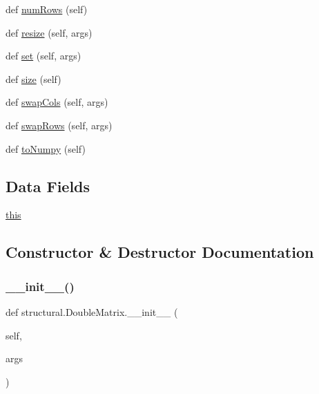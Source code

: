 \begin{DoxyCompactItemize}
def \hyperlink{classstructural_1_1_double_matrix_ac0206186f7a02e55aab1b4e7644a5a42}{num\+Rows} (self)
\item 
def \hyperlink{classstructural_1_1_double_matrix_ad669bca5d79c58f5d458573399972008}{resize} (self, args)
\item 
def \hyperlink{classstructural_1_1_double_matrix_a6f07b8fbbca87434b0a90c895235a7db}{set} (self, args)
\item 
def \hyperlink{classstructural_1_1_double_matrix_ae8ffc645068e1a857a1fcd0ff2827298}{size} (self)
\item 
def \hyperlink{classstructural_1_1_double_matrix_af32016ca742674bd0dd7976aba7fc2ab}{swap\+Cols} (self, args)
\item 
def \hyperlink{classstructural_1_1_double_matrix_aca79974b91d141231f5f2ac5bd4e55a4}{swap\+Rows} (self, args)
\item 
def \hyperlink{classstructural_1_1_double_matrix_a0233526da54ca0ddfa27e12f40064bbb}{to\+Numpy} (self)
\end{DoxyCompactItemize}
\subsection*{Data Fields}
\begin{DoxyCompactItemize}
\item 
\hyperlink{classstructural_1_1_double_matrix_afb4db79b07fae3e3bff2b0f1a7d9a2bf}{this}
\end{DoxyCompactItemize}


\subsection{Constructor \& Destructor Documentation}
\mbox{\label{classstructural_1_1_double_matrix_a6131a882a868f04fae0bbe40fd618901}} 
\subsubsection{\texorpdfstring{\+\_\+\+\_\+init\+\_\+\+\_\+()}{\_\_init\_\_()}}
{\footnotesize\ttfamily def structural.\+Double\+Matrix.\+\_\+\+\_\+init\+\_\+\+\_\+ (\begin{DoxyParamCaption}\item[{}]{self,  }\item[{}]{args }\end{DoxyParamCaption})}



